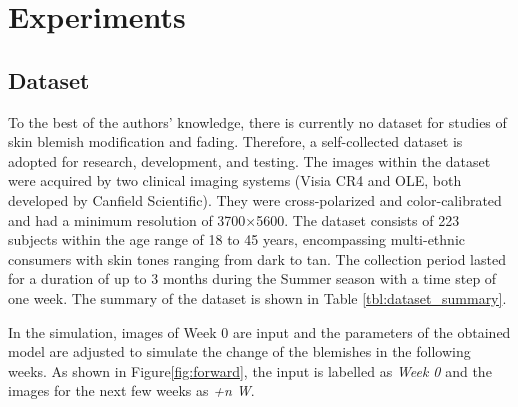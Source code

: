 
\chapter{Experiments}
\begin{spacing}{1.5}
\setlength{\parskip}{0.3in}
\section{Dataset}
To the best of the authors' knowledge, there is currently no dataset for studies of skin blemish modification and fading. Therefore, a self-collected dataset is adopted for research, development, and testing. The images within the dataset were acquired by two clinical imaging systems (Visia CR4 and OLE, both developed by Canfield Scientific). They were cross-polarized and color-calibrated and had a minimum resolution of 3700$\times$5600. The dataset consists of 223 subjects within the age range of 18 to 45 years, encompassing multi-ethnic consumers with skin tones ranging from dark to tan. The collection period lasted for a duration of up to 3 months during the Summer season with a time step of one week. The summary of the dataset is shown in Table \ref{tbl:dataset_summary}.

In the simulation, images of Week 0 are input and the parameters of the obtained model are adjusted to simulate the change of the blemishes in the following weeks. As shown in Figure\ref{fig:forward}, the input is labelled as \textit{Week 0} and the images for the next few weeks as \textit{+n W}.
\begin{table}[t!]
    \caption{Summary of Dataset Statistics}
    \label{tbl:dataset_summary}
\end{table}


\end{spacing}
